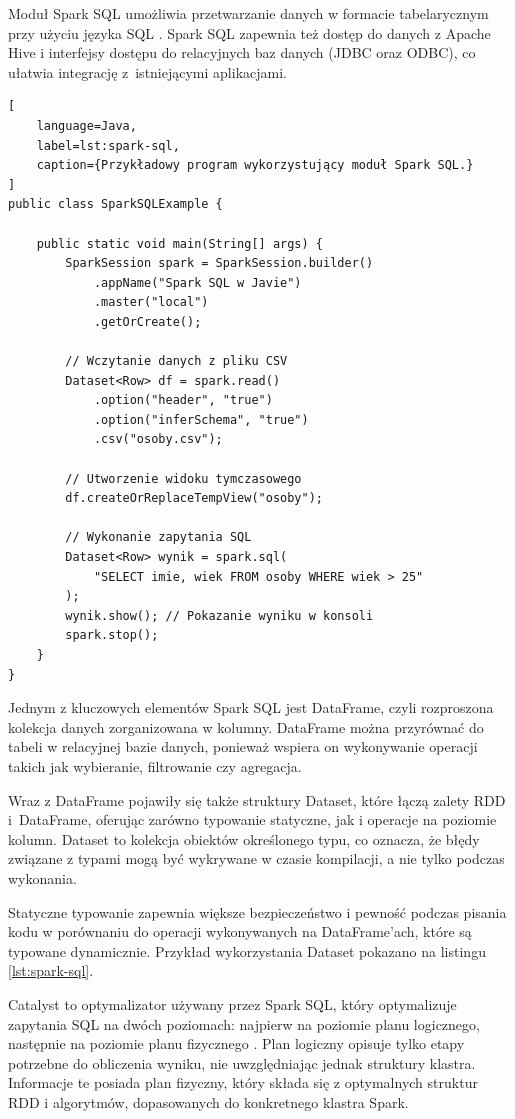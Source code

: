 Moduł Spark SQL umożliwia przetwarzanie danych w formacie tabelarycznym przy użyciu języka
SQL \cite{spark-sql}. Spark SQL zapewnia też dostęp do danych z Apache Hive i interfejsy
dostępu do relacyjnych baz danych (JDBC oraz ODBC), co ułatwia integrację z~istniejącymi
aplikacjami.

\begin{lstlisting}[
    language=Java,
    label=lst:spark-sql,
    caption={Przykładowy program wykorzystujący moduł Spark SQL.}
]
public class SparkSQLExample {

    public static void main(String[] args) {
        SparkSession spark = SparkSession.builder()
            .appName("Spark SQL w Javie")
            .master("local")
            .getOrCreate();

        // Wczytanie danych z pliku CSV
        Dataset<Row> df = spark.read()
            .option("header", "true")
            .option("inferSchema", "true")
            .csv("osoby.csv");

        // Utworzenie widoku tymczasowego
        df.createOrReplaceTempView("osoby");

        // Wykonanie zapytania SQL
        Dataset<Row> wynik = spark.sql(
            "SELECT imie, wiek FROM osoby WHERE wiek > 25"
        );
        wynik.show(); // Pokazanie wyniku w konsoli
        spark.stop();
    }
}
\end{lstlisting}

Jednym z kluczowych elementów Spark SQL jest DataFrame, czyli rozproszona kolekcja danych
zorganizowana w kolumny. DataFrame można przyrównać do tabeli w relacyjnej bazie danych,
ponieważ wspiera on wykonywanie operacji takich jak wybieranie, filtrowanie czy agregacja.

Wraz z DataFrame pojawiły się także struktury Dataset, które łączą zalety RDD i~DataFrame,
oferując zarówno typowanie statyczne, jak i operacje na poziomie kolumn. Dataset to kolekcja
obiektów określonego typu, co oznacza, że błędy związane z typami mogą być wykrywane w czasie
kompilacji, a nie tylko podczas wykonania.

Statyczne typowanie zapewnia większe bezpieczeństwo i pewność podczas pisania kodu w
porównaniu do operacji wykonywanych na DataFrame'ach, które są typowane dynamicznie.
Przykład wykorzystania Dataset pokazano na listingu \ref{lst:spark-sql}.

Catalyst to optymalizator używany przez Spark SQL, który optymalizuje zapytania SQL na dwóch
poziomach: najpierw na poziomie planu logicznego, następnie na poziomie planu fizycznego
\cite{spark-sql-catalyst}. Plan logiczny opisuje tylko etapy potrzebne do obliczenia wyniku,
nie uwzględniając jednak struktury klastra. Informacje te posiada plan fizyczny, który składa
się z optymalnych struktur RDD i algorytmów, dopasowanych do konkretnego klastra Spark.

